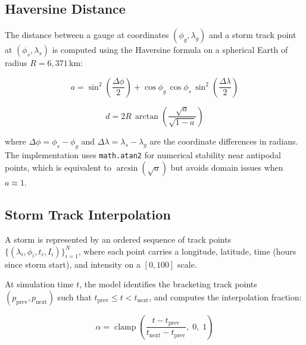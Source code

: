 \documentclass[11pt,a4paper]{article}
\begin{document}
\mkmframework

\subsection{Haversine Distance}
\label{sec:haversine}

The distance between a gauge at coordinates $(\phi_g, \lambda_g)$ and a storm
track point at $(\phi_s, \lambda_s)$ is computed using the Haversine formula on
a spherical Earth of radius $R = 6{,}371$\,km:

\begin{equation}
    a = \sin^2\!\left(\frac{\Delta\phi}{2}\right)
      + \cos\phi_g \,\cos\phi_s \,\sin^2\!\left(\frac{\Delta\lambda}{2}\right)
    \label{eq:haversine_a}
\end{equation}

\begin{equation}
    d = 2R \,\arctan\!\left(\frac{\sqrt{a}}{\sqrt{1-a}}\right)
    \label{eq:haversine_d}
\end{equation}

\noindent where $\Delta\phi = \phi_s - \phi_g$ and
$\Delta\lambda = \lambda_s - \lambda_g$ are the coordinate differences in
radians. The implementation uses \texttt{math.atan2} for numerical stability
near antipodal points, which is equivalent to $\arcsin(\sqrt{a})$ but avoids
domain issues when $a \approx 1$.

\subsection{Storm Track Interpolation}
\label{sec:track_interp}

A storm is represented by an ordered sequence of track points
$\{(\lambda_i, \phi_i, t_i, I_i)\}_{i=1}^{N}$, where each point carries a
longitude, latitude, time (hours since storm start), and intensity on a
$[0, 100]$ scale.

At simulation time $t$, the model identifies the bracketing track points
$(p_{\text{prev}}, p_{\text{next}})$ such that
$t_{\text{prev}} \leq t < t_{\text{next}}$, and computes the interpolation
fraction:

\begin{equation}
    \alpha = \operatorname{clamp}\!\left(
        \frac{t - t_{\text{prev}}}{t_{\text{next}} - t_{\text{prev}}},\; 0,\; 1
    \right)
    \label{eq:interp_frac}
\end{equation}
\end{document}
